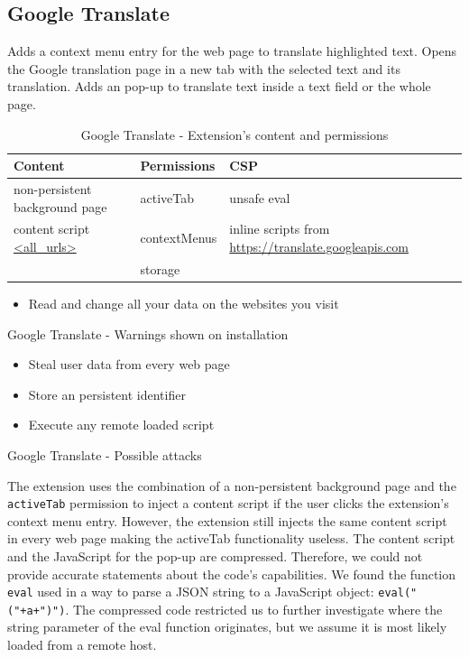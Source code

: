 \documentclass[article,colorback,accentcolor=tud9c,type=bsc]{tudthesis}
\let\stdsubsection\subsection
\renewcommand\subsection{\newpage\stdsubsection}
\begin{document}
	
\subsection{Google Translate}
	Adds a context menu entry for the web page to translate highlighted text. Opens the Google translation page in a new tab with the selected text and its translation. Adds an pop-up to translate text inside a text field or the whole page. \\
	
	\begin{table}[h]
		\centering
		\begin{tabular}{|l|l|l|} \hline
			\textbf{Content} & \textbf{Permissions} & \textbf{CSP} \\ \hline
			non-persistent background page & activeTab & unsafe eval\\
			content script \url{<all_urls>} & contextMenus & inline scripts from \url{https://translate.googleapis.com} \\
			& storage & \\ \hline
		\end{tabular}
		\caption{Google Translate - Extension's content and permissions}
	\end{table}
	
	\begin{listing}
		\begin{itemize}
			\item  Read and change all your data on the websites you visit
		\end{itemize}
		\caption{Google Translate - Warnings shown on installation}
	\end{listing}
	
	\begin{listing}
		\begin{itemize}
			\item Steal user data from every web page
			\item Store an persistent identifier
			\item Execute any remote loaded script
		\end{itemize}
		\caption{Google Translate - Possible attacks}
	\end{listing}
	
	The extension uses the combination of a non-persistent background page and the \texttt{activeTab} permission to inject a content script if the user clicks the extension's context menu entry. However, the extension still injects the same content script in every web page making the activeTab functionality useless. The content script and the JavaScript for the pop-up are compressed. Therefore, we could not provide accurate statements about the code's capabilities. We found the function \texttt{eval} used in a way to parse a JSON string to a JavaScript object: \texttt{eval("("+a+")")}. The compressed code restricted us to further investigate where the string parameter of the eval function originates, but we assume it is most likely loaded from a remote host. \\
	
\end{document}

